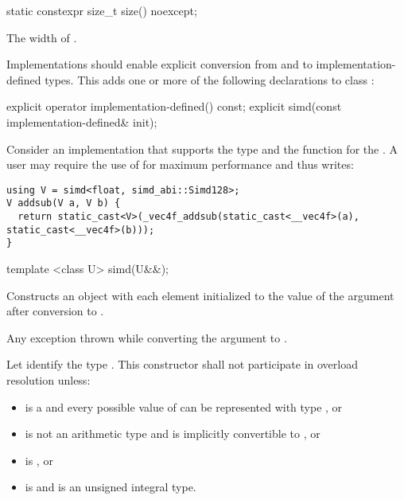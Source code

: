 \begin{itemdecl}
static constexpr size_t size() noexcept;
\end{itemdecl}
\begin{itemdescr}
  \pnum\returns The width of \simd[<T, Abi>].
\end{itemdescr}

\pnum Implementations should enable explicit conversion from and to implementation-defined types.
This adds one or more of the following declarations to class \simd:
\begin{itemdecl}
  explicit operator implementation-defined() const;
  explicit simd(const implementation-defined& init);
\end{itemdecl}

\begin{exampleEnv}\label{impl-conversion-example}
  Consider an implementation that supports the type  and the function  for the \currentTarget.
  A user may require the use of  for maximum performance and thus writes:
  \begin{lstlisting}[style=Vc]
using V = simd<float, simd_abi::Simd128>;
V addsub(V a, V b) {
  return static_cast<V>(_vec4f_addsub(static_cast<__vec4f>(a), static_cast<__vec4f>(b)));
}
  \end{lstlisting}
\end{exampleEnv}


%

\begin{itemdecl}
template <class U> simd(U&&);
\end{itemdecl}
\begin{itemdescr}
  \pnum\effects Constructs an object with each element initialized to the value of the argument after conversion to .

  \pnum\throws Any exception thrown while converting the argument to .

  \pnum\remarks
  Let  identify the type .
  This constructor shall not participate in overload resolution unless:
  \begin{itemize}
    \item {} is a \realArithmeticType and every possible value of  can be represented with type , or
    \item {} is not an arithmetic type and is implicitly convertible to , or
    \item {} is \intt, or
    \item {} is \uint and  is an unsigned integral type.
  \end{itemize}
\end{itemdescr}

